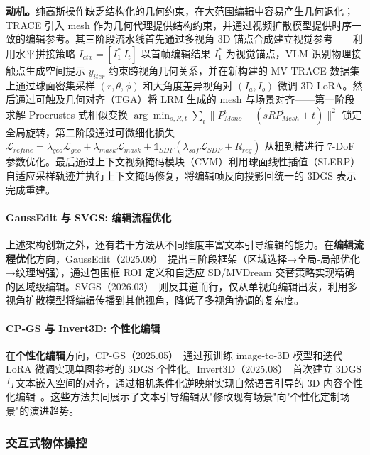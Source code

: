 \textbf{动机。}纯高斯操作缺乏结构化的几何约束，在大范围编辑中容易产生几何退化；TRACE 引入 mesh 作为几何代理提供结构约束，并通过视频扩散模型提供时序一致的编辑参考。其三阶段流水线首先通过多视角 3D 锚点合成建立视觉参考——利用水平拼接策略 $I_{ctx} = [I_1^* \ I_t]$ 以首帧编辑结果 $I_1^*$ 为视觉锚点，VLM 识别物理接触点生成空间提示 $y_{iter}$ 约束跨视角几何关系，并在新构建的 MV-TRACE 数据集上通过球面密集采样 $(r,\theta,\phi)$ 和大角度差异视角对 $(I_a, I_b)$ 微调 3D-LoRA。然后通过可触及几何对齐（TGA）将 LRM 生成的 mesh 与场景对齐——第一阶段求解 Procrustes 式相似变换 $\arg\min_{s,R,t}\sum_i\|P_{Mono}^i - (sRP_{Mesh}^i + t)\|^2$ 锁定全局旋转，第二阶段通过可微细化损失 $\mathcal{L}_{refine} = \lambda_{geo}\mathcal{L}_{geo} + \lambda_{mask}\mathcal{L}_{mask} + \mathbb{1}_{SDF}(\lambda_{sdf}\mathcal{L}_{SDF} + R_{reg})$ 从粗到精进行 7-DoF 参数优化。最后通过上下文视频掩码模块（CVM）利用球面线性插值（SLERP）自适应采样轨迹并执行上下文掩码修复，将编辑帧反向投影回统一的 3DGS 表示完成重建。

\paragraph{GaussEdit 与 SVGS: 编辑流程优化}

上述架构创新之外，还有若干方法从不同维度丰富文本引导编辑的能力。在\textbf{编辑流程优化}方向，GaussEdit（2025.09）~\cite{2509_26055}提出三阶段框架（区域选择→全局-局部优化→纹理增强），通过包围框 ROI 定义和自适应 SD/MVDream 交替策略实现精确的区域级编辑。SVGS（2026.03）~\cite{2603_28126}则反其道而行，仅从单视角编辑出发，利用多视角扩散模型将编辑传播到其他视角，降低了多视角协调的复杂度。

\paragraph{CP-GS 与 Invert3D: 个性化编辑}

在\textbf{个性化编辑}方向，CP-GS（2025.05）~\cite{2505_14537}通过预训练 image-to-3D 模型和迭代 LoRA 微调实现单图参考的 3DGS 个性化。Invert3D（2025.08）~\cite{2508_16932}首次建立 3DGS 与文本嵌入空间的对齐，通过相机条件化逆映射实现自然语言引导的 3D 内容个性化编辑~\cite{2505_11934,2507_04961,2508_17645,2512_20129}。这些方法共同展示了文本引导编辑从"修改现有场景"向"个性化定制场景"的演进趋势。

\subsubsection{交互式物体操控}

